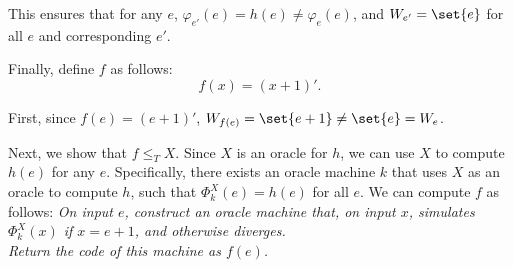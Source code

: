 \begin{problem}
\begin{enumalph}
\begin{answer}
        This ensures that for any $e$, $\varphi_{e'}(e) = h(e) \neq \varphi_e(e)$,
        and $W_{e'} = \set{ e }$ for all $e$ and corresponding $e'$.

        Finally, define $f$ as follows:
        \[
          f(x) = (x + 1)'.
        \]

        \begin{enumarabic}
          \item First, since $f(e) = (e + 1)'$,
            $W_{f(e)} = \set{ e + 1 } \neq \set{ e } = W_e$.
          \item Next, we show that $f \leq_T X$.
            Since $X$ is an oracle for $h$, we can use $X$ to compute $h(e)$
            for any $e$. Specifically, there exists an oracle machine $k$
            that uses $X$ as an oracle to compute $h$, such that
            $\Phi_k^X(e) = h(e)$ for all $e$.
            We can compute $f$ as follows: \newline
            \emph{
              On input $e$, construct an oracle machine that,
              on input $x$, simulates $\Phi_k^X(x)$ if $x = e + 1$,
              and otherwise diverges. \\
              Return the code of this machine as $f(e)$.
            }
        \end{enumarabic}
      \end{answer}
  \end{enumalph}
\end{problem}
